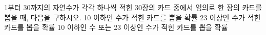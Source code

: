 1부터 30까지의 자연수가 각각 하나씩 적힌 30장의 카드 중에서 임의로 한 장의 카드를 뽑을 때, 다음을 구하시오.
 10 이하인 수가 적힌 카드를 뽑을 확률
 23 이상인 수가 적힌 카드를 뽑을 확률
 10 이하인 수 또는 23 이상인 수가 적힌 카드를 뽑을 확률
